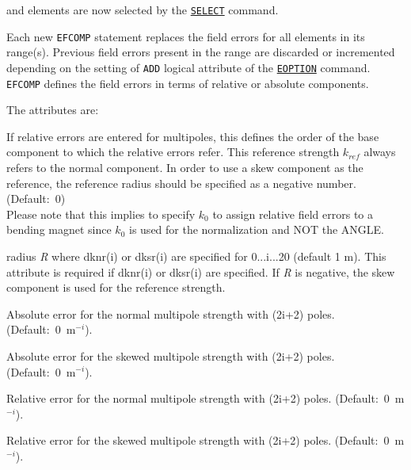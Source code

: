 and elements are now selected by the
\hyperref[sec:select]{\tt SELECT} command. 

Each new {\tt EFCOMP} statement replaces the field errors for all
elements in its range(s). Previous field errors present in the range are
discarded or incremented depending on the setting of
{\tt ADD} logical attribute of the \hyperref[sec:eoption]{\tt EOPTION} command. 
{\tt EFCOMP} defines the field errors in terms of
relative or absolute components.

The attributes are: 
\begin{madlist}
   If relative errors are entered for multipoles, this defines
  the order of the base component to which the relative  errors
  refer. This reference strength $k_{ref}$ always refers to the
  normal component. In order to use a skew component as the reference, the
  reference radius should be specified as a negative number. (Default:~0)  \\
  Please note that this implies to specify $k_0$ to assign
  relative field errors to a bending magnet since $k_0$ is used
  for the normalization and NOT the ANGLE. 

   radius {\it R} where dknr(i) or dksr(i) are specified
  for 0...i...20 (default 1 m). This attribute is required if dknr(i) or
  dksr(i) are specified. If {\it R} is negative, the skew component is
  used for the reference strength.  

   Absolute error for the normal multipole strength with
  (2i+2) poles. (Default:~0~m$^{-i}$).  

   Absolute error for the skewed multipole strength with
  (2i+2) poles. (Default:~0~m$^{-i}$).  

   Relative error for the normal multipole strength with
  (2i+2) poles. (Default:~0~m$^{-i}$).  

   Relative error for the skewed multipole strength with
  (2i+2) poles. (Default:~0~m$^{-i}$).  
\end{madlist}


